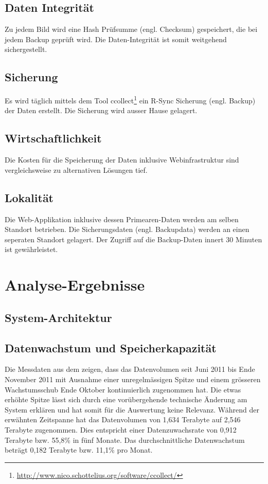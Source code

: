 \subsection{Daten Integrität}
Zu jedem Bild wird eine Hash Prüfsumme (engl. Checksum) gespeichert, die bei jedem Backup geprüft wird. Die Daten-Integrität ist somit weitgehend sichergestellt.

\subsection{Sicherung}
Es wird täglich mittels dem Tool ccollect\footnote{\url{http://www.nico.schottelius.org/software/ccollect/}} ein R-Sync Sicherung (engl. Backup) der Daten erstellt. Die Sicherung wird ausser Hause gelagert.

\subsection{Wirtschaftlichkeit}
Die Kosten für die Speicherung der Daten inklusive Webinfrastruktur sind vergleichsweise zu alternativen Lösungen tief.

\subsection{Lokalität}

Die Web-Applikation inklusive dessen \gls{Primearen-Daten} werden am selben Standort betrieben. Die Sicherungsdaten (engl. Backupdata) werden an einen seperaten Standort gelagert. Der Zugriff auf die Backup-Daten innert 30 Minuten ist gewährleistet.

\section{Analyse-Ergebnisse}

\subsection{System-Architektur}

\subsection{Datenwachstum und Speicherkapazität}
Die Messdaten aus dem   zeigen, dass das Datenvolumen seit  Juni 2011 bis Ende November 2011 mit Ausnahme einer unregelmässigen Spitze und einem grösseren Wachstumsschub Ende Oktober kontinuierlich zugenommen hat. Die etwas erhöhte Spitze lässt sich durch eine vorübergehende technische Änderung am System erklären und hat somit für die Auswertung keine Relevanz. Während der erwähnten Zeitspanne hat das Datenvolumen von 1,634 Terabyte auf 2,546 Terabyte zugenommen. Dies entspricht einer Datenzuwachsrate von 0,912 Terabyte bzw. 55,8\% in fünf Monate. Das durchschnittliche Datenwachstum beträgt 0,182 Terabyte bzw. 11,1\% pro Monat.

